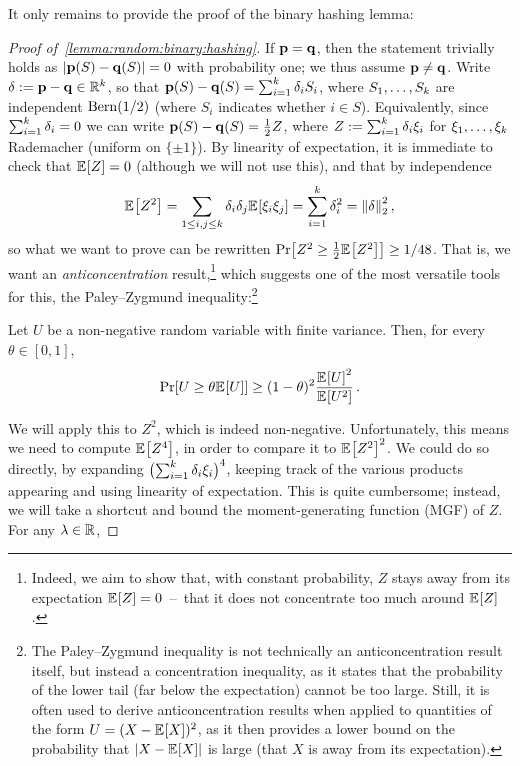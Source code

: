 It only remains to provide the proof of the binary hashing lemma:
\begin{proof}[Proof of~\cref{lemma:random:binary:hashing}]
If $\mathbf{p}=\mathbf{q}$, then the statement trivially holds as $|\mathbf{p}(S)-\mathbf{q}(S)|=0$ with probability one; we thus assume $\mathbf{p}\neq \mathbf{q}$. 
Write $\delta := \mathbf{p}-\mathbf{q}\in\mathbb{R}^k$, so that $\mathbf{p}(S)-\mathbf{q}(S) = \sum_{i=1}^k \delta_i S_i$, where $S_1,\dots, S_k$ are independent $\operatorname{Bern}( 1/2 ) $ (where $S_i$ indicates whether $i\in S$). Equivalently, since $\sum_{i=1}^k \delta_i=0$ we can write $\mathbf{p}(S)-\mathbf{q}(S) = \frac{1}{2}Z$, where $Z := \sum_{i=1}^k \delta_i \xi_i$ for $\xi_1,\dots,\xi_k$ \iid Rademacher (uniform on $\{\pm 1\}$). By linearity of expectation, it is immediate to check that $\bEE{Z}=0$ (although we will not use this), and that by independence  
\[
  \bEE{Z^2} = \sum_{1\leq i,j\leq \ab} \delta_i\delta_j \bEE{\xi_i\xi_j} = \sum_{i=1}^\ab \delta_i^2 = \normtwo{\delta}^2\,,
\]
so what we want to prove can be rewritten $\bPr{ Z^2 \geq \frac{1}{2} \bEE{Z^2} } \geq 1/48$. That is, we want an \emph{anticoncentration} result,\footnote{Indeed, we aim to show that, with constant probability, $Z$ stays away from its expectation $\bEE{Z}=0$~--~\ie that it does not concentrate too much around $\bEE{Z}$.} which suggests one of the most versatile tools for this, the Paley--Zygmund inequality:\footnote{The Paley--Zygmund inequality is not technically an anticoncentration result itself, but instead a concentration inequality, as it states that the probability of the lower tail (far below the expectation) cannot be too large. Still, it is often used to derive anticoncentration results when applied to quantities of the form $U=(X-\bEE{X})^2$, as it then provides a lower bound on the probability that $|X-\bEE{X}|$ is large (\ie that $X$ is away from its expectation).}
\begin{theorem}
  \label{theo:pz}
Let $U$ be a non-negative random variable with finite variance. Then, for every $\theta\in[0,1]$,
\[
    \bPr{ U \geq \theta \bEE{U} } \geq (1-\theta)^2\frac{\bEE{U}^2}{\bEE{U^2}}\,.
\]
\end{theorem}
We will apply this to $Z^2$, which is indeed non-negative. Unfortunately, this means we need to compute $\bEE{Z^4}$, in order to compare it to $\bEE{Z^2}^2$. We could do so directly, by expanding $\big({\sum_{i=1}^k \delta_i \xi_i}\big)^4$, keeping track of the various products appearing and using linearity of expectation. This is quite cumbersome; instead, we will take a shortcut and bound the moment-generating function (MGF) of $Z$. For any $\lambda\in\mathbb{R}$,

\end{proof}
